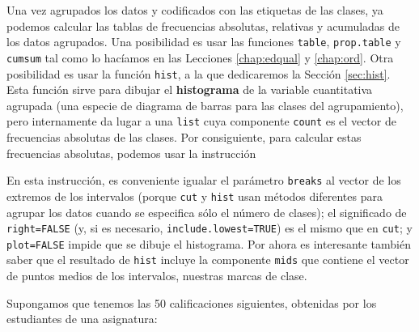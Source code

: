 \documentclass[]{book}
\newenvironment{Shaded}{\begin{snugshade}}{\end{snugshade}}
\newcommand{\DataTypeTok}[1]{\textcolor[rgb]{0.13,0.29,0.53}{#1}}
\newcommand{\KeywordTok}[1]{\textcolor[rgb]{0.13,0.29,0.53}{\textbf{#1}}}
\newcommand{\NormalTok}[1]{#1}
\newcommand{\OperatorTok}[1]{\textcolor[rgb]{0.81,0.36,0.00}{\textbf{#1}}}
\newcommand{\OtherTok}[1]{\textcolor[rgb]{0.56,0.35,0.01}{#1}}
\theoremstyle{definition}
\theoremstyle{definition}
\theoremstyle{definition}
\theoremstyle{remark}
\let\BeginKnitrBlock\begin \let\EndKnitrBlock\end
\begin{document}
Una vez agrupados los datos y codificados con las etiquetas de las clases, ya podemos calcular las tablas de frecuencias absolutas, relativas y acumuladas de los datos agrupados. Una posibilidad es usar las funciones \texttt{table}, \texttt{prop.table} y \texttt{cumsum} tal como lo hacíamos en las Lecciones \ref{chap:edqual} y \ref{chap:ord}. Otra posibilidad es usar la función \texttt{hist}, a la que dedicaremos la Sección \ref{sec:hist}. Esta función sirve para dibujar el \textbf{histograma} de la variable cuantitativa agrupada (una especie de diagrama de barras para las clases del agrupamiento), pero internamente da lugar a una \texttt{list} cuya componente \texttt{count} es el vector de frecuencias absolutas de las clases. Por consiguiente, para calcular estas frecuencias absolutas, podemos usar la instrucción

\begin{Shaded}
\end{Shaded}

En esta instrucción, es conveniente igualar el parámetro \texttt{breaks} al vector de los extremos de los intervalos (porque \texttt{cut} y \texttt{hist} usan métodos diferentes para agrupar los datos cuando se especifica sólo el número de clases); el significado de \texttt{right=FALSE} (y, si es necesario, \texttt{include.lowest=TRUE}) es el mismo que en \texttt{cut}; y \texttt{plot=FALSE} impide que se dibuje el histograma. Por ahora es interesante también saber que el resultado de \texttt{hist} incluye la componente \texttt{mids} que contiene el vector de puntos medios de los intervalos, nuestras marcas de clase.

\BeginKnitrBlock{example}
\protect\hypertarget{exm:notes}{}{\label{exm:notes} }Supongamos que tenemos las 50 calificaciones siguientes, obtenidas por los estudiantes de una asignatura:
\EndKnitrBlock{example}
\end{document}
